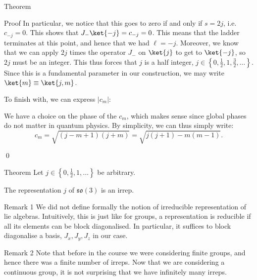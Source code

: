\documentclass[a4paper]{article}
\begin{document}
\begin{parag}{Theorem}
\begin{subparag}{Proof}
        In particular, we notice that this goes to zero if and only if $s = 2j$, i.e. $c_{-j} = 0$. This shows that $J_- \ket{-j} = c_{-j} = 0$. This means that the ladder terminates at this point, and hence that we had $\ell = -j$. Moreover, we know that we can apply $2j$ times the operator $J_-$ on $\ket{j}$ to get to $\ket{-j}$, so $2j$ must be an integer. This thus forces that $j$ is a half integer, $j \in \left\{0, \frac{1}{2}, 1, \frac{3}{2}, \ldots\right\}$. Since this is a fundamental parameter in our construction, we may write $\ket{m} \equiv \ket{j, m}$.
        
        To finish with, we can express $\left|c_m\right|$:
        
        We have a choice on the phase of the $c_m$, which makes sense since global phases do not matter in quantum physics. By simplicity, we can thus simply write: 
        \[c_m = \sqrt{\left(j-m+1\right)\left(j+m\right)} = \sqrt{j\left(j+1\right) - m\left(m-1\right)}.\]

        \qed
    \end{subparag}
\end{parag}

\begin{parag}{Theorem}
    Let $j \in \left\{0, \frac{1}{2}, 1, \ldots\right\}$ be arbitrary.

    The representation $j$ of $\mathfrak{so}\left(3\right)$ is an irrep.

    \begin{subparag}{Remark 1}
        We did not define formally the notion of irreducible representation of lie algebras. Intuitively, this is just like for groups, a representation is reducible if all its elements can be block diagonalised. In particular, it suffices to block diagonalise a basis, $J_x, J_y, J_z$ in our case.
    \end{subparag}

    \begin{subparag}{Remark 2}
        Note that before in the course we were considering finite groups, and hence there was a finite number of irreps. Now that we are considering a continuous group, it is not surprising that we have infinitely many irreps.
    \end{subparag}
\end{parag}
\end{document}
